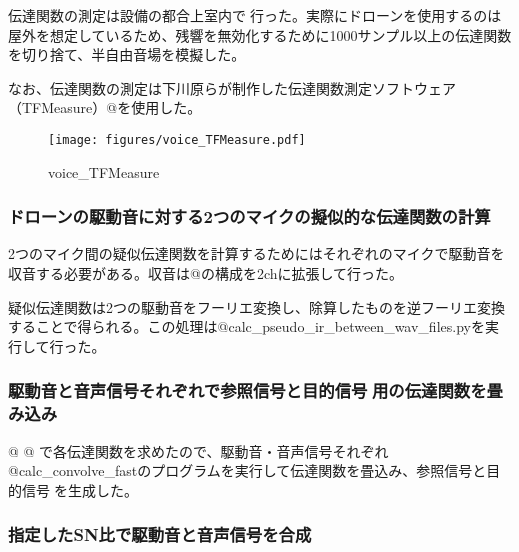 伝達関数の測定は設備の都合上室内で行った。実際にドローンを使用するのは屋外を想定しているため、残響を無効化するために1000サンプル以上の伝達関数を切り捨て、半自由音場を模擬した。

なお、伝達関数の測定は下川原らが制作した伝達関数測定ソフトウェア（TFMeasure）@を使用した。

\begin{figure}
\centering
\texttt{[image: figures/voice\_TFMeasure.pdf]}
\caption{voice\_TFMeasure}
\end{figure}

\hypertarget{ux30c9ux30edux30fcux30f3ux306eux99c6ux52d5ux97f3ux306bux5bfeux3059ux308b2ux3064ux306eux30deux30a4ux30afux306eux64ecux4f3cux7684ux306aux4f1dux9054ux95a2ux6570ux306eux8a08ux7b97}{%
\subsubsection{ドローンの駆動音に対する2つのマイクの擬似的な伝達関数の計算}\label{ux30c9ux30edux30fcux30f3ux306eux99c6ux52d5ux97f3ux306bux5bfeux3059ux308b2ux3064ux306eux30deux30a4ux30afux306eux64ecux4f3cux7684ux306aux4f1dux9054ux95a2ux6570ux306eux8a08ux7b97}}

2つのマイク間の疑似伝達関数を計算するためにはそれぞれのマイクで駆動音を収音する必要がある。収音は@の構成を2chに拡張して行った。

疑似伝達関数は2つの駆動音をフーリエ変換し、除算したものを逆フーリエ変換することで得られる。この処理は@calc\_pseudo\_ir\_between\_wav\_files.pyを実行して行った。

\hypertarget{ux99c6ux52d5ux97f3ux3068ux97f3ux58f0ux4fe1ux53f7ux305dux308cux305eux308cux3067ux53c2ux7167ux4fe1ux53f7ux3068ux76eeux7684ux4fe1ux53f7ux7528ux306eux4f1dux9054ux95a2ux6570ux3092ux7573ux307fux8fbcux307f}{%
\subsubsection{駆動音と音声信号それぞれで参照信号と目的信号用の伝達関数を畳み込み}\label{ux99c6ux52d5ux97f3ux3068ux97f3ux58f0ux4fe1ux53f7ux305dux308cux305eux308cux3067ux53c2ux7167ux4fe1ux53f7ux3068ux76eeux7684ux4fe1ux53f7ux7528ux306eux4f1dux9054ux95a2ux6570ux3092ux7573ux307fux8fbcux307f}}

@ @
で各伝達関数を求めたので、駆動音・音声信号それぞれ@calc\_convolve\_fastのプログラムを実行して伝達関数を畳込み、参照信号と目的信号を生成した。

\hypertarget{ux6307ux5b9aux3057ux305fsnux6bd4ux3067ux99c6ux52d5ux97f3ux3068ux97f3ux58f0ux4fe1ux53f7ux3092ux5408ux6210}{%
\subsubsection{指定したSN比で駆動音と音声信号を合成}\label{ux6307ux5b9aux3057ux305fsnux6bd4ux3067ux99c6ux52d5ux97f3ux3068ux97f3ux58f0ux4fe1ux53f7ux3092ux5408ux6210}}

